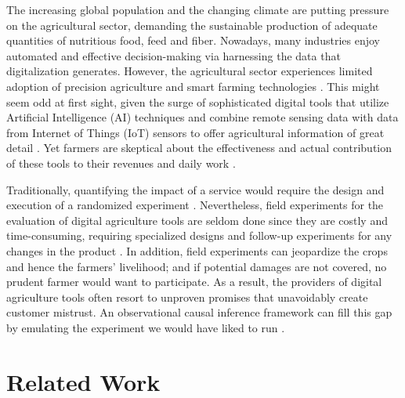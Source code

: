 \documentclass[letterpaper]{article} %
\begin{document}


The increasing global population and the changing climate are putting pressure on the agricultural sector, demanding the sustainable production of adequate quantities of nutritious food, feed and fiber. Nowadays, many industries enjoy automated and effective decision-making via harnessing the data that digitalization generates. However, the agricultural sector experiences limited adoption of precision agriculture and smart farming technologies \cite{gabriel2022adoption}. This might seem odd at first sight, given the surge of sophisticated digital tools that utilize Artificial Intelligence (AI) techniques and combine remote sensing data with data from Internet of Things (IoT) sensors to offer agricultural information of great detail \cite{sharma2020machine, nanushi2022pest, choumos2022towards}.
Yet farmers are skeptical about the effectiveness and actual contribution of these tools to their revenues and daily work \cite{lowenberg2019setting, lioutas2021digitalization}. 

Traditionally, quantifying the impact of a service would require the design and execution of a randomized experiment \cite{boruch1997randomized}. Nevertheless, field experiments for the evaluation of digital agriculture tools are seldom done since they are costly and time-consuming, requiring specialized designs and follow-up experiments for any changes in the product \cite{vaessen2010challenges, diggleexperimental}. In addition, field experiments can jeopardize the crops and hence the farmers' livelihood; and if potential damages are not covered, no prudent farmer would want to participate. As a result, the providers of digital agriculture tools often resort to unproven promises that unavoidably create customer mistrust. An observational causal inference framework \cite{pearl2009causality} can fill this gap by emulating the experiment we would have liked to run \cite{hernan2016using}.

\section{Related Work}
\end{document}
